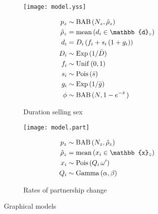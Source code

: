 \begin{figure}
  \begin{subfigure}{\textwidth}
    \begin{minipage}{.5\textwidth}
      \centering\texttt{[image: model.yss]}
    \end{minipage}
    \begin{minipage}{.5\textwidth}
      \begin{align}
           p_z &\sim \distr{BAB}{N_z, \hat{\rho}_z} \\
  \hat{\rho}_z &=    \distr{mean}{d_i \in \mathbb{d}_z} \\
           d_i &=    D_i\,(f_i + s_i\,(1 + g_i)) \\
           D_i &\sim \distr{Exp}{1/\bar{D}} \\
           f_i &\sim \distr{Unif}{0,1} \\
           s_i &\sim \distr{Pois}{\bar{s}} \\
           g_i &\sim \distr{Exp}{1/\bar{g}} \\
          \phi &\sim \distr{BAB}{N, 1-e^{-\bar{s}}\,}
      \end{align}
    \end{minipage}
    \caption{Duration selling sex}
    \label{fig:model.yss}
  \end{subfigure}
  \begin{subfigure}{\textwidth}
    \begin{minipage}{.5\textwidth}
      \centering\texttt{[image: model.part]}
    \end{minipage}
    \begin{minipage}{.5\textwidth}
      \begin{align}
           p_z &\sim \distr{BAB}{N_z, \hat{\rho}_z} \\
  \hat{\rho}_z &=    \distr{mean}{x_i \in \mathbb{x}_z} \\
           x_i &\sim \distr{Pois}{Q_i\,\omega'} \\
           Q_i &\sim \distr{Gamma}{\alpha,\beta}
      \end{align}
    \end{minipage}
    \caption{Rates of partnership change}
    \label{fig:model.part}
  \end{subfigure}
  \caption{Graphical models}
  \label{fig:model}
\end{figure}
